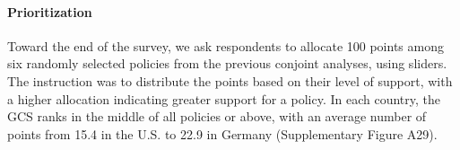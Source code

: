 

\paragraph{Prioritization}\label{subsubsec:prioritization} %

Toward the end of the survey, we ask respondents to allocate 100 points among six randomly selected policies from the previous conjoint analyses, using sliders. The instruction was to distribute the points based on their level of support, with a higher allocation indicating greater support for a policy. %
In each country, the GCS ranks in the middle of all policies or above, with an average number of points from 15.4 in the U.S. to 22.9 in Germany (Supplementary Figure A29).%

